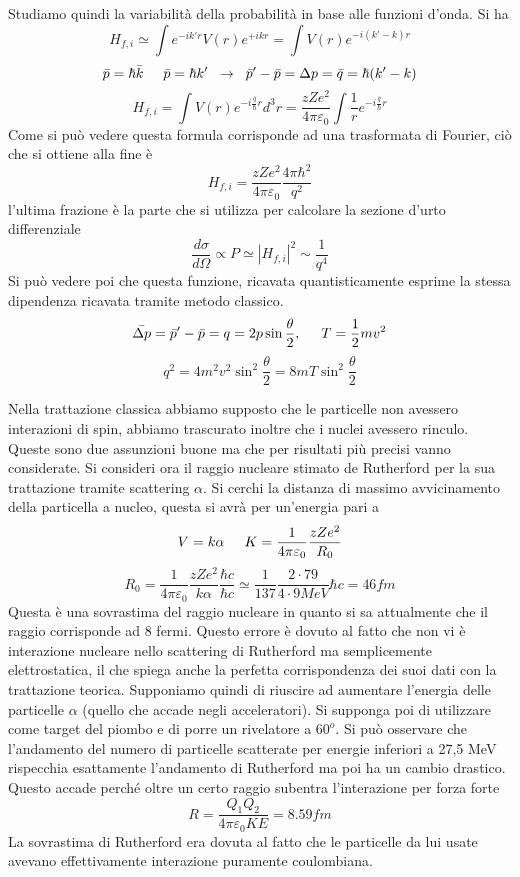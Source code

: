 Studiamo quindi la variabilità della probabilità in base alle funzioni d'onda. 
Si ha
\[H_{f,i}\simeq \int e^{-ik'r} V(r)e^{+ikr}=\int V(r)e^{-i(k'-k)r}\]
\[\bar p=\hbar \bar k \hspace{0.5cm} \bar p=\hbar k' \hspace{0.2cm}\to\hspace{0.2cm}\bar p' -\bar p =\Delta p=\bar q=\hbar (k'-k)\]
\[H_{f,i}=\int V(r) e^{-i\frac{\bar q}{\hbar}r}d^3r=\frac{zZe^2}{4\pi\varepsilon_0}\int \frac{1}{r}e^{-i\frac{\bar q}{\hbar}r}\]
Come si può vedere questa formula corrisponde ad una trasformata di Fourier, ciò che si ottiene alla fine è
\[H_{f,i}=\frac{zZe^2}{4\pi\varepsilon_0}\frac{4\pi\hbar^2}{q^2}\]
l'ultima frazione è la parte che si utilizza per calcolare la sezione d'urto differenziale
\[\frac{d\sigma}{d\Omega}\propto P\simeq |H_{f,i}|^2\sim\frac{1}{q^4}\]
Si può vedere poi che questa funzione, ricavata quantisticamente esprime la stessa dipendenza ricavata tramite metodo classico.
\[\bar{\Delta p}=\bar p'-\bar p=q=2p \sin\frac{\theta}{2}, \hspace{0.5cm}T=\frac{1}{2}mv^2\]
\[q^2=4m^2v^2\sin^2 \frac{\theta}{2}=8mT\sin^2\frac{\theta}{2}\]

Nella trattazione classica abbiamo supposto che le particelle non avessero interazioni di spin, abbiamo trascurato inoltre che i nuclei avessero rinculo. 
Queste sono due assunzioni buone ma che per risultati più precisi vanno considerate.
Si consideri ora il raggio nucleare stimato de Rutherford per la sua trattazione tramite scattering $\alpha$. 
Si cerchi la distanza di massimo avvicinamento della particella a nucleo, questa si avrà per un'energia pari a 
\[V=k\alpha \hspace{0.5cm}K=\frac{1}{4\pi\varepsilon_0}\frac{zZe^2}{R_0}\]
\[R_0=\frac{1}{4\pi\varepsilon_0}\frac{zZe^2}{k\alpha}\frac{\hbar c}{\hbar c}\simeq\frac{1}{137}\frac{2\cdot 79}{4\cdot 9 MeV}\hbar c =46 fm\]
Questa è una sovrastima del raggio nucleare in quanto si sa attualmente che il raggio corrisponde ad 8 fermi. 
Questo errore è dovuto al fatto che non vi è interazione nucleare nello scattering di Rutherford ma semplicemente elettrostatica, il che spiega anche la perfetta corrispondenza dei suoi dati con la trattazione teorica. 
Supponiamo quindi di riuscire ad aumentare l'energia delle particelle $\alpha$ (quello che accade negli acceleratori). 
Si supponga poi di utilizzare come target del piombo e di porre un rivelatore a $60^o$. 
Si può osservare che l'andamento del numero di particelle scatterate per energie inferiori a 27,5 MeV rispecchia esattamente l'andamento di Rutherford ma poi ha un cambio drastico. 
Questo accade perché oltre un certo raggio subentra l'interazione per forza forte
\[R=\frac{Q_1Q_2}{4\pi\varepsilon_0KE}=8.59 fm\]
La sovrastima di Rutherford era dovuta al fatto che le particelle da lui usate avevano effettivamente interazione puramente coulombiana.